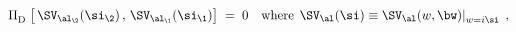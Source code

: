 \begin{equation}\label{locality}
\Pi_{\rm D}^{}\;\big[\,\SV_{\al_\2}(\si_\2)\, , \,
\SV_{\al_\1}(\si_\1) \big]\;=\;0\quad\text{where}\;\, \SV_{\al}(\si)\equiv
 \SV_{\al}(w,\bw)|_{w=i\si}^{}\;\, ,  
\end{equation}

